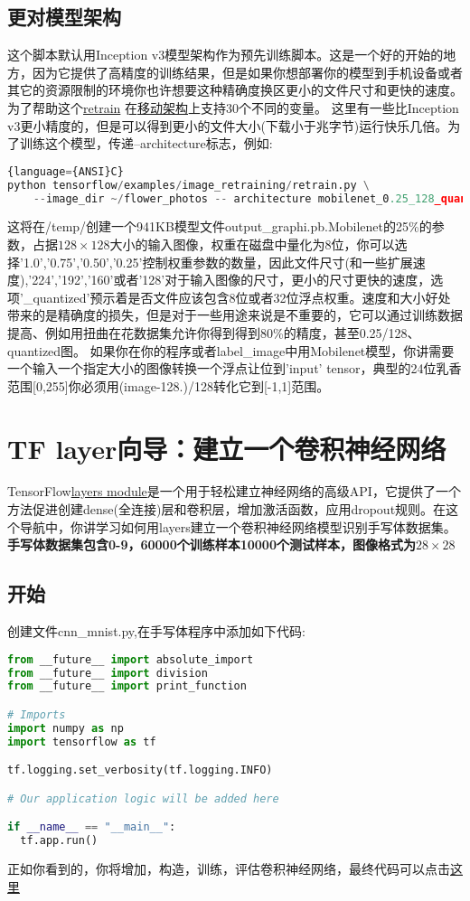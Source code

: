 \subsection{更对模型架构}
这个脚本默认用Inception v3模型架构作为预先训练脚本。这是一个好的开始的地方，因为它提供了高精度的训练结果，但是如果你想部署你的模型到手机设备或者其它的资源限制的环境你也许想要这种精确度换区更小的文件尺寸和更快的速度。
为了帮助这个\href{https://github.com/tensorflow/tensorflow/blob/master/tensorflow/examples/image_retraining/retrain.py}{retrain}
在\href{https://research.googleblog.com/2017/06/mobilenets-open-source-models-for.html}{移动架构}上支持30个不同的变量。
这里有一些比Inception v3更小精度的，但是可以得到更小的文件大小(下载小于兆字节)运行快乐几倍。为了训练这个模型，传递--architecture标志，例如:
\begin{lstlisting}[language=Python]{language={ANSI}C}
python tensorflow/examples/image_retraining/retrain.py \
    --image_dir ~/flower_photos -- architecture mobilenet_0.25_128_quantized
\end{lstlisting}
这将在/temp/创建一个941KB模型文件output\_graphi.pb.Mobilenet的25\%的参数，占据$128\times128$大小的输入图像，权重在磁盘中量化为8位，你可以选择'1.0','0.75','0.50','0.25'控制权重参数的数量，因此文件尺寸(和一些扩展速度),'224','192','160'或者'128'对于输入图像的尺寸，更小的尺寸更快的速度，选项'\_quantized'预示着是否文件应该包含8位或者32位浮点权重。速度和大小好处带来的是精确度的损失，但是对于一些用途来说是不重要的，它可以通过训练数据提高、例如用扭曲在花数据集允许你得到得到80\%的精度，甚至0.25/128、quantized图。
如果你在你的程序或者label\_image中用Mobilenet模型，你讲需要一个输入一个指定大小的图像转换一个浮点让位到'input' tensor，典型的24位乳香范围[0,255]你必须用(image-128.)/128转化它到[-1,1]范围。
\section{TF layer向导：建立一个卷积神经网络}
TensorFlow\href{https://www.tensorflow.org/api_docs/python/tf/layers}{layers module}是一个用于轻松建立神经网络的高级API，它提供了一个方法促进创建dense(全连接)层和卷积层，增加激活函数，应用dropout规则。在这个导航中，你讲学习如何用layers建立一个卷积神经网络模型识别手写体数据集。
\textbf{手写体数据集包含0-9，60000个训练样本10000个测试样本，图像格式为}$28\times28$
\subsection{开始}
创建文件cnn\_mnist.py,在手写体程序中添加如下代码:
\begin{lstlisting}[language=Python]
from __future__ import absolute_import
from __future__ import division
from __future__ import print_function

# Imports
import numpy as np
import tensorflow as tf

tf.logging.set_verbosity(tf.logging.INFO)

# Our application logic will be added here

if __name__ == "__main__":
  tf.app.run()
\end{lstlisting}
正如你看到的，你将增加，构造，训练，评估卷积神经网络，最终代码可以点击\href{https://www.github.com/tensorflow/tensorflow/blob/r1.3/tensorflow/examples/tutorials/layers/cnn_mnist.py}{这里}
